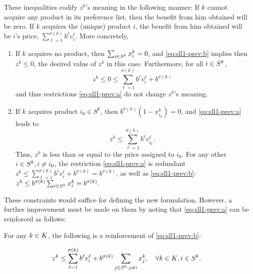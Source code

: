 These inequalities codify $z^k$'s meaning in the following manner: If $k$ cannot
acquire any product in its preference list, then the benefit from him obtained
will be zero. If $k$ acquires the (unique) product $i$, the benefit from him
obtained will be $i$'s price,
$
    \sum_{\ell=1}^{\sigma(k)} b^\ell v_i^\ell
$.
More concretely,
\begin{enumerate}
    
    \item %
        If $k$ acquires no product, then
        $
            \sum_{i \in S^k} x_i^k = 0
        $,
	and \eqref{eq:sll1-prev:b} implies then $z^k \leq 0$, the desired value of
	$z^k$ in this case. Furthermore, for all ${i \in S^k}$,
	\[
	    z^k \leq 0 \leq \sum_{\ell=1}^{\sigma(k)} b^\ell v_i^\ell + b^{\sigma(k)}
	\]
	and thus restrictions \eqref{eq:sll1-prev:a} do not change $z^k$'s
	meaning.
    \item %
	If $k$ acquires product $i_0 \in S^k$, then
	$b^{\sigma(k)}\left(1-x_{i_0}^k\right)=0$, and \eqref{eq:sll1-prev:a} leads to
	\[
	    z^k \leq \sum_{\ell=1}^{\sigma(k)} b^\ell v_{i_0}^\ell.
	\]
	Thus, $z^k$ is less than or equal to the price assigned to $i_0$. For
	any other ${i \in S^k}, i \neq i_0$, the restriction \eqref{eq:sll1-prev:a} is
	redundant
	$
	    z^k \leq \sum_{\ell=1}^{\sigma(k)} b^\ell v_i^\ell + b^{\sigma(k)}
	        =    b^{\sigma(k)}
	$,
	as well as \eqref{eq:sll1-prev:b}:
	$
	    z^k \leq b^{\sigma(k)}\sum_{i \in S^k} x_i^k = b^{\sigma(k)}.
	$
	
\end{enumerate}

These constraints would suffice for defining the new formulation. However, a
further improvement must be made on them by noting that \eqref{eq:sll1-prev:a}
can be reinforced as follows:

\begin{proposition}
    For any ${k \in K}$, the following is a reinforcement of \eqref{eq:sll1-prev:b}:
    {
        \newcommand{\suml}    {\sum_{\ell=1}^{\sigma(k)}}
        \newcommand{\sumi}    {\sum_{\is}}
        \newcommand{\sumjneq} {\sum_{j \in S^k : j \neq i}}

        \begin{equation}
            z^k \leq \suml b^\ell v_i^\ell + b^{\sigma(k)} \sumjneq x_j^k,
                \quad \forall \kk, \is. \label{eq:sll1-prev:d}
        \end{equation}
    }
\end{proposition}


